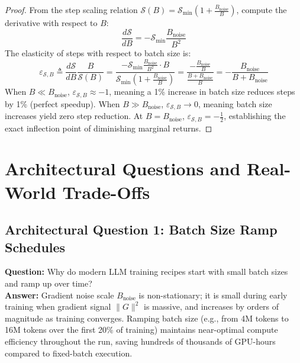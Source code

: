 \documentclass[11pt,a4paper]{article}
\theoremstyle{definition}
\begin{document}
\begin{proof}
From the step scaling relation $\mathcal{S}(B) = \mathcal{S}_{\min} \left(1 + \frac{B_{\text{noise}}}{B}\right)$, compute the derivative with respect to $B$:
\begin{equation}
\frac{d \mathcal{S}}{d B} = -\mathcal{S}_{\min} \frac{B_{\text{noise}}}{B^2}
\end{equation}
The elasticity of steps with respect to batch size is:
\begin{equation}
\varepsilon_{\mathcal{S}, B} \triangleq \frac{d \mathcal{S}}{d B} \frac{B}{\mathcal{S}(B)} = \frac{-\mathcal{S}_{\min} \frac{B_{\text{noise}}}{B^2} \cdot B}{\mathcal{S}_{\min} \left( 1 + \frac{B_{\text{noise}}}{B} \right)} = \frac{-\frac{B_{\text{noise}}}{B}}{\frac{B + B_{\text{noise}}}{B}} = -\frac{B_{\text{noise}}}{B + B_{\text{noise}}}
\end{equation}
When $B \ll B_{\text{noise}}$, $\varepsilon_{\mathcal{S}, B} \approx -1$, meaning a 1\% increase in batch size reduces steps by 1\% (perfect speedup).
When $B \gg B_{\text{noise}}$, $\varepsilon_{\mathcal{S}, B} \to 0$, meaning batch size increases yield zero step reduction.
At $B = B_{\text{noise}}$, $\varepsilon_{\mathcal{S}, B} = -\frac{1}{2}$, establishing the exact inflection point of diminishing marginal returns.
\end{proof}

\section{Architectural Questions and Real-World Trade-Offs}

\subsection{Architectural Question 1: Batch Size Ramp Schedules}
\textbf{Question:} Why do modern LLM training recipes start with small batch sizes and ramp up over time?\\
\textbf{Answer:} Gradient noise scale $B_{\text{noise}}$ is non-stationary; it is small during early training when gradient signal $\|G\|^2$ is massive, and increases by orders of magnitude as training converges. Ramping batch size (e.g., from 4M tokens to 16M tokens over the first 20\% of training) maintains near-optimal compute efficiency throughout the run, saving hundreds of thousands of GPU-hours compared to fixed-batch execution.
\end{document}
